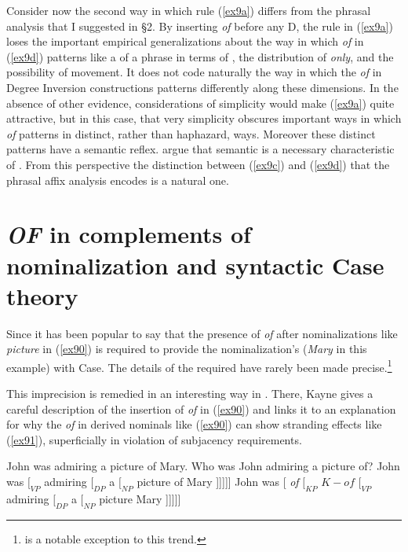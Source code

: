 \documentclass[output=paper,
modfonts
]{LSP/langsci}
\begin{document}
{Consider now the second way in which rule ({\ref{ex9a}}) differs from the phrasal  analysis that I suggested in \S2.  By inserting {\textit{of}} before any D, the rule in ({\ref{ex9a}}) loses the important empirical generalizations about the way in which {\textit{of}} in ({\ref{ex9d}}) patterns like a  of a phrase in terms of , the distribution of {\textit{only}}, and the possibility of movement.  It does not code naturally the way in which the {\textit{of}} in Degree Inversion constructions patterns differently along these dimensions.  In the absence of other evidence, considerations of simplicity would make ({\ref{ex9a}}) quite attractive, but in this case, that very simplicity obscures important ways in which {\textit{of}} patterns in distinct, rather than haphazard, ways.  Moreover these distinct patterns have a semantic reflex.  {\citet{Peters06}} argue that semantic  is a necessary characteristic of . From this perspective the distinction between ({\ref{ex9c}}) and ({\ref{ex9d}}) that the phrasal affix analysis encodes is a natural one.

 
                 
                
\section{{\textit{OF}} in complements of nominalization and syntactic Case theory}
Since {\citet{Chomsky81}} it has been popular to say that the presence of {\textit{of}} after nominalizations like {\textit{picture}} in ({\ref{ex90}}) is required to provide the nominalization's  ({\textit{Mary}} in this example) with Case.  The details of the required  have rarely been made precise.{\footnote{{\citet{Harley98}} is a notable exception to this trend.}}} This imprecision is remedied in an interesting way in {\citet{Kayne02}}.  There, Kayne gives a careful description of the insertion of {\textit{of}} in ({\ref{ex90}}) and links it to an explanation for why the {\textit{of}} in derived nominals like ({\ref{ex90}}) can show stranding effects like ({\ref{ex91}}), superficially in violation of subjacency requirements.  

\begin{exe}
\ex\label{ex90}  John was admiring a picture of Mary.
\ex\label{ex91}  Who was John admiring a picture of?
\ex\label{ex92}  John was  $[_{VP} $  admiring $ [_{DP} $ a  $[_{NP} $  picture  of Mary ]]]]]
\ex\label{ex93}  John was [ {\textit{of}} $[_{KP}$ $K-{\textit{of}}$   $[_{VP}$ admiring $[_{DP}$ a $[_{NP}$ picture Mary ]]]]]
\end{exe}
\end{document}
